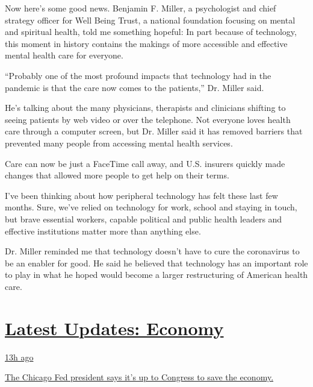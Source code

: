 Now here's some good news. Benjamin F. Miller, a psychologist and chief
strategy officer for Well Being Trust, a national foundation focusing on
mental and spiritual health, told me something hopeful: In part because
of technology, this moment in history contains the makings of more
accessible and effective mental health care for everyone.

``Probably one of the most profound impacts that technology had in the
pandemic is that the care now comes to the patients,'' Dr. Miller said.

He's talking about the many physicians, therapists and clinicians
shifting to seeing patients by web video or over the telephone. Not
everyone loves health care through a computer screen, but Dr. Miller
said it has removed barriers that prevented many people from accessing
mental health services.

Care can now be just a FaceTime call away, and U.S. insurers quickly
made changes that allowed more people to get help on their terms.

I've been thinking about how peripheral technology has felt these last
few months. Sure, we've relied on technology for work, school and
staying in touch, but brave essential workers, capable political and
public health leaders and effective institutions matter more than
anything else.

Dr. Miller reminded me that technology doesn't have to cure the
coronavirus to be an enabler for good. He said he believed that
technology has an important role to play in what he hoped would become a
larger restructuring of American health care.

\hypertarget{latest-updates-economy}{%
\section{\texorpdfstring{\href{https://www.nytimes3xbfgragh.onion/live/2020/08/03/business/stock-market-today-coronavirus?action=click\&pgtype=Article\&state=default\&region=MAIN_CONTENT_1\&context=storylines_live_updates}{Latest
Updates:
Economy}}{Latest Updates: Economy}}\label{latest-updates-economy}}

\href{https://www.nytimes3xbfgragh.onion/live/2020/08/03/business/stock-market-today-coronavirus?action=click\&pgtype=Article\&state=default\&region=MAIN_CONTENT_1\&context=storylines_live_updates\#the-chicago-fed-president-says-its-up-to-congress-to-save-the-economy}{13h
ago}

\href{https://www.nytimes3xbfgragh.onion/live/2020/08/03/business/stock-market-today-coronavirus?action=click\&pgtype=Article\&state=default\&region=MAIN_CONTENT_1\&context=storylines_live_updates\#the-chicago-fed-president-says-its-up-to-congress-to-save-the-economy}{The
Chicago Fed president says it's up to Congress to save the economy.}

